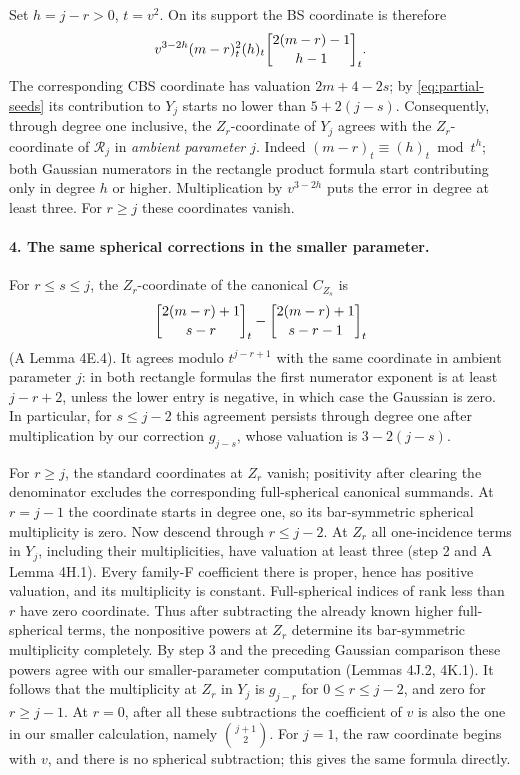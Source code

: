 Set \(h=j-r>0\), \(t=v^2\). On its support the BS coordinate is therefore
\[
 v^{3-2h}(m-r)_t^2(h)_t\gb{2(m-r)-1}{h-1}_t .
\]
The corresponding CBS coordinate has valuation \(2m+4-2s\); by \eqref{eq:partial-seeds} its contribution to \(Y_j\) starts no lower than \(5+2(j-s)\). Consequently, through degree one inclusive, the \(Z_r\)-coordinate of \(Y_j\) agrees with the \(Z_r\)-coordinate of \(\mathcal R_j\) in \emph{ambient parameter \(j\)}. Indeed \((m-r)_t\equiv(h)_t\bmod t^h\); both Gaussian numerators in the rectangle product formula start contributing only in degree \(h\) or higher. Multiplication by \(v^{3-2h}\) puts the error in degree at least three. For \(r\ge j\) these coordinates vanish.

\paragraph{4. The same spherical corrections in the smaller parameter.}
For \(r\le s\le j\), the \(Z_r\)-coordinate of the canonical \(C_{Z_s}\) is
\[
 \gb{2(m-r)+1}{s-r}_t-\gb{2(m-r)+1}{s-r-1}_t
\]
(A Lemma 4E.4). It agrees modulo \(t^{j-r+1}\) with the same coordinate in ambient parameter \(j\): in both rectangle formulas the first numerator exponent is at least \(j-r+2\), unless the lower entry is negative, in which case the Gaussian is zero. In particular, for \(s\le j-2\) this agreement persists through degree one after multiplication by our correction \(g_{j-s}\), whose valuation is \(3-2(j-s)\).

For \(r\ge j\), the standard coordinates at \(Z_r\) vanish;
positivity after clearing the denominator excludes the corresponding
full-spherical canonical summands. At \(r=j-1\) the coordinate starts
in degree one, so its bar-symmetric spherical multiplicity is zero.
Now descend through \(r\le j-2\). At \(Z_r\) all one-incidence terms in \(Y_j\), including their multiplicities, have valuation at least three (step 2 and A Lemma 4H.1). Every family-F coefficient there is proper, hence has positive valuation, and its multiplicity is constant. Full-spherical indices of rank less than \(r\) have zero coordinate. Thus after subtracting the already known higher full-spherical terms, the nonpositive powers at \(Z_r\) determine its bar-symmetric multiplicity completely. By step 3 and the preceding Gaussian comparison these powers agree with our smaller-parameter computation (Lemmas 4J.2, 4K.1). It follows that the multiplicity at \(Z_r\) in \(Y_j\) is \(g_{j-r}\) for \(0\le r\le j-2\), and zero for \(r\ge j-1\). At \(r=0\), after all these subtractions the coefficient of \(v\) is also the one in our smaller calculation, namely \(\binom{j+1}{2}\). For \(j=1\), the raw coordinate begins with \(v\), and there is no spherical subtraction; this gives the same formula directly.

